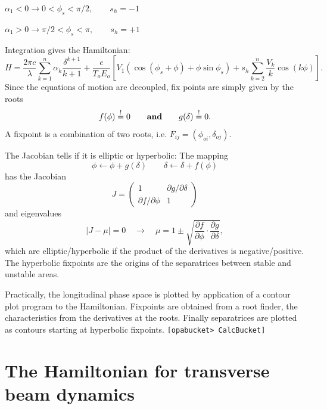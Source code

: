\documentclass[12pt]{article}
\newcommand\beq{\begin{equation}}
\newcommand\eeq{\end{equation}}
\newcommand\code[1]{{\tt [#1]}}
\begin{document}
$\alpha_1 < 0 \longrightarrow 0< \phi_s < \pi/2, \qquad s_h=-1$

$\alpha_1 > 0 \longrightarrow \pi/2< \phi_s < \pi,\qquad s_h=+1$

Integration gives the Hamiltonian:
\beq
H = \frac{2\pi c}{\lambda} \sum_{k=1}^{n} \alpha_k\frac{\delta^{k+1}}{k+1} + \frac{e}{T_oE_o}\left[ V_1 \left(\cos(\phi_s+\phi)+\phi\sin\phi_s\right)+s_h\sum_{k=2}^n \frac{V_k}{k}\cos(k \phi)\right].
\eeq
Since the equations of motion are decoupled, fix points are simply given by the roots
\beq
f(\phi)\stackrel{!}{=}0\qquad \mbox{\bf and}\qquad g(\delta)\stackrel{!}{=}0.
\eeq
A fixpoint is a combination of two roots, i.e. $F_{ij}=(\phi_{oi}, \delta_{oj})$.

The Jacobian tells if it is elliptic or hyperbolic: The mapping
\beq
\phi \leftarrow \phi+g(\delta) \qquad \delta \leftarrow \delta +f(\phi)
\eeq
has the Jacobian
\beq
J = \left( \begin{array}{cc} 1 & \partial g/\partial \delta \\ \partial f/\partial\phi & 1 \end{array}\right)
\eeq
and eigenvalues
\beq
|J-\mu|=0\quad \longrightarrow \quad \mu=1\pm\sqrt{\frac{\partial f}{\partial \phi}\cdot \frac{\partial g}{\partial \delta}},
\eeq
which are elliptic/hyperbolic if the product of the derivatives is negative/positive.
The hyperbolic fixpoints are the origins of the separatrices between stable and unstable areas.

Practically, the longitudinal phase space is plotted by application of a contour plot program \cite{CONRECT} to the Hamiltonian. Fixpoints are obtained from a root finder, the characteristics from the derivatives at the roots. Finally separatrices are plotted as contours starting at hyperbolic fixpoints.
\code{opabucket> CalcBucket}



\section{\label{secham}The Hamiltonian for transverse beam dynamics}
\end{document}
